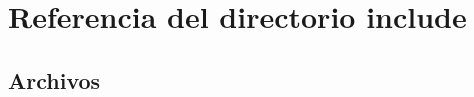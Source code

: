 \section{Referencia del directorio include}
\label{dir_d44c64559bbebec7f509842c48db8b23}
\subsection*{Archivos}
\begin{DoxyCompactItemize}
\end{DoxyCompactItemize}
